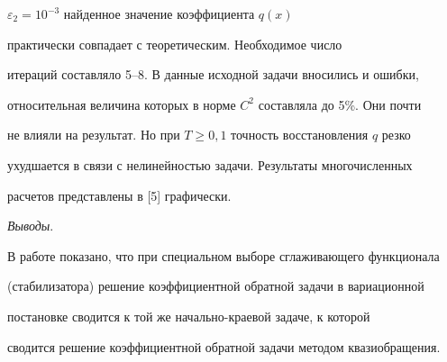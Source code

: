 $\varepsilon_2=10^{-3}$ найденное значение коэффициента $q(x)$ 


практически совпадает с теоретическим. Необходимое число 


итераций составляло 5--8. В данные исходной задачи вносились и ошибки, 


относительная величина которых в норме $C^2$ составляла до 5\%. Они почти 


не влияли на результат. Но при $T\ge0,1$ точность восстановления $q$ резко 


ухудшается в связи с нелинейностью задачи. Результаты многочисленных 


расчетов представлены в [5] графически. 


\medskip 


 


{\it Выводы}. 


В работе показано, что при специальном выборе сглаживающего функционала 


(стабилизатора) решение коэффициентной обратной задачи в вариационной 


постановке сводится к той же начально-краевой задаче, к которой 


сводится решение коэффициентной обратной задачи методом квазиобращения. 


 


 



